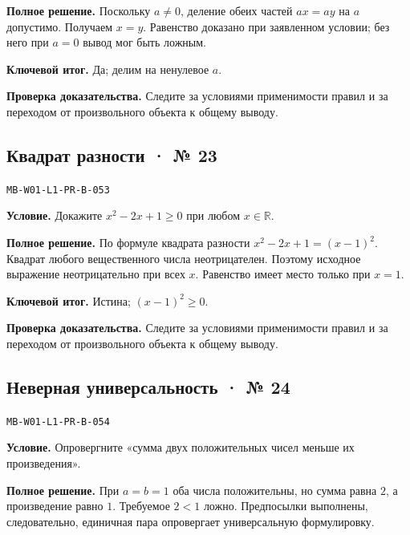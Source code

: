 \documentclass[11pt,a4paper,openany]{book}
\newcommand{\muid}[1]{\texttt{\footnotesize #1}}
\begin{document}
\textbf{Полное решение.} Поскольку $a\ne0$, деление обеих частей $ax=ay$ на $a$ допустимо. Получаем $x=y$. Равенство доказано при заявленном условии; без него при $a=0$ вывод мог быть ложным.


\begin{learnbox}\textbf{Ключевой итог.} Да; делим на ненулевое $a$.\par \textbf{Проверка доказательства.} 
Следите за условиями применимости правил и за переходом от произвольного объекта к общему выводу. 
\end{learnbox}

\subsection*{Квадрат разности · № 23}\hypertarget{solution:MB-W01-L1-PR-B-053}{}

\muid{MB-W01-L1-PR-B-053}\par

\textbf{Условие.} Докажите $x^2-2x+1\ge0$ при любом $x\in\mathbb R$.\par

\textbf{Полное решение.} По формуле квадрата разности $x^2-2x+1=(x-1)^2$. Квадрат любого вещественного числа неотрицателен. Поэтому исходное выражение неотрицательно при всех $x$. Равенство имеет место только при $x=1$.


\begin{learnbox}\textbf{Ключевой итог.} Истина; $(x-1)^2\ge0$.\par \textbf{Проверка доказательства.} 
Следите за условиями применимости правил и за переходом от произвольного объекта к общему выводу. 
\end{learnbox}

\subsection*{Неверная универсальность · № 24}\hypertarget{solution:MB-W01-L1-PR-B-054}{}

\muid{MB-W01-L1-PR-B-054}\par

\textbf{Условие.} Опровергните «сумма двух положительных чисел меньше их произведения».\par

\textbf{Полное решение.} При $a=b=1$ оба числа положительны, но сумма равна $2$, а произведение равно $1$. Требуемое $2<1$ ложно. Предпосылки выполнены, следовательно, единичная пара опровергает универсальную формулировку.
\end{document}
